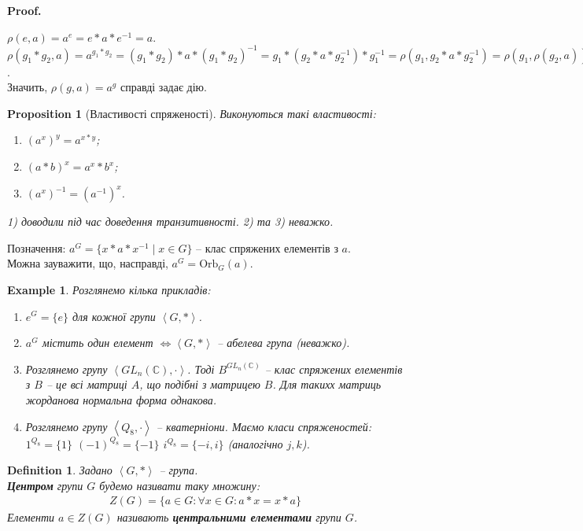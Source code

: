 \documentclass[a4paper, 10pt]{article}
\makeatletter
\theoremstyle{theoremdd}
\theoremstyle{theoremdd}
\newtheorem{definition}[theorem]{Definition}
\theoremstyle{theoremdd}
\theoremstyle{theoremdd}
\theoremstyle{theoremdd}
\newtheorem{example}[theorem]{Example}
\theoremstyle{theoremdd}
\theoremstyle{theoremdd}
\theoremstyle{theoremdd}
\theoremstyle{theoremdd}
\newtheorem{proposition}[theorem]{Proposition}
\theoremstyle{theoremdd}
\theoremstyle{theoremdd}
\theoremstyle{theoremdd}
\theoremstyle{theoremdd}
\theoremstyle{theoremdd}
\theoremstyle{theoremdd}
\renewenvironment{proof}[1][Proof.\\]{\par
\pushQED{\hfill \qed}%
\normalfont \topsep6\p@\@plus6\p@\relax
\trivlist
\item\relax
{\bfseries
#1\@addpunct{.}}\hspace\labelsep\ignorespaces
}{%
\popQED\endtrivlist\@endpefalse
}
\newcommand\Orb{\text{Orb}}
\makeatother
\begin{document}
\begin{proof}
$\rho(e,a) = a^e = e*a*e^{-1} = a$.\\
$\rho(g_1*g_2,a) = a^{g_1*g_2} = (g_1*g_2)*a*(g_1*g_2)^{-1} = g_1*(g_2*a*g_2^{-1})*g_1^{-1} = \rho(g_1,g_2*a*g_2^{-1}) = \rho(g_1,\rho(g_2,a))$.\\
Значить, $\rho(g,a) = a^g$ справді задає дію.
\end{proof}

\begin{proposition}[Властивості спряженості]
Виконуються такі властивості:
\begin{enumerate}[nosep,wide=0pt,label={\arabic*)}]
\item $(a^x)^y = a^{x*y}$;
\item $(a*b)^x = a^x*b^x$;
\item $(a^x)^{-1} = (a^{-1})^x$.
\end{enumerate}
\textit{1) доводили під час доведення транзитивності. 2) та 3) неважко.}
\end{proposition}

Позначення: $a^G = \{ x*a*x^{-1} \mid x \in G\}$ -- клас спряжених елементів з $a$.\\ Можна зауважити, що, насправді, $a^G = \Orb_G(a)$.

\begin{example}
Розглянемо кілька прикладів:
\begin{enumerate}[nosep,wide=0pt,label={\arabic*.}]
\item $e^G = \{e\}$ для кожної групи $\left<G,*\right>$.
\item $a^G$ містить один елемент $\iff \left<G,* \right>$ -- абелева група (неважко).
\item Розглянемо групу $\left< GL_n(\mathbb{C}), \cdot \right>$. Тоді $B^{GL_n(\mathbb{C})}$ -- клас спряжених елементів з $B$ -- це всі матриці $A$, що подібні з матрицею $B$. Для такихх матриць жорданова нормальна форма однакова.
\item Розглянемо групу $\left< Q_8, \cdot \right>$ -- кватерніони. Маємо класи спряженостей:\\
$1^{Q_8} = \{1\}$ \hspace{0.5cm} $(-1)^{Q_8} = \{-1\}$ \hspace{0.5cm} $i^{Q_8} = \{-i,i\}$ (аналогічно $j,k$).
\end{enumerate}
\end{example}

\begin{definition}
Задано $\left< G, *\right>$ -- група.\\
\textbf{Центром} групи $G$ будемо називати таку множину:
\begin{align*}
Z(G) = \{ a \in G: \forall x \in G: a*x = x*a\}
\end{align*}
Елементи $a \in Z(G)$ називають \textbf{центральними елементами} групи $G$.
\end{definition}
\end{document}
